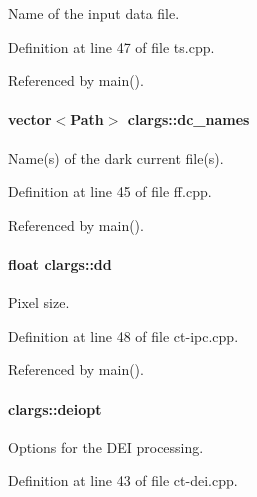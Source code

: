 Name of the input data file. 



Definition at line 47 of file ts.cpp.



Referenced by main().

\hypertarget{structclargs_ab36a2f3b791e04772d842cb85013089a}{
\paragraph[{dc\_\-names}]{\setlength{\rightskip}{0pt plus 5cm}vector$<${\bf Path}$>$ {\bf clargs::dc\_\-names}}\hfill}
\label{structclargs_ab36a2f3b791e04772d842cb85013089a}


Name(s) of the dark current file(s). 



Definition at line 45 of file ff.cpp.



Referenced by main().

\hypertarget{structclargs_a4c19429952a40f11a48647d667a18592}{
\paragraph[{dd}]{\setlength{\rightskip}{0pt plus 5cm}float {\bf clargs::dd}}\hfill}
\label{structclargs_a4c19429952a40f11a48647d667a18592}


Pixel size. 



Definition at line 48 of file ct-\/ipc.cpp.



Referenced by main().

\hypertarget{structclargs_ae28454c473f2c5ea18ff989ee5c7578b}{
\paragraph[{deiopt}]{ {\bf clargs::deiopt}}\hfill}
\label{structclargs_ae28454c473f2c5ea18ff989ee5c7578b}


Options for the DEI processing. 



Definition at line 43 of file ct-\/dei.cpp.



